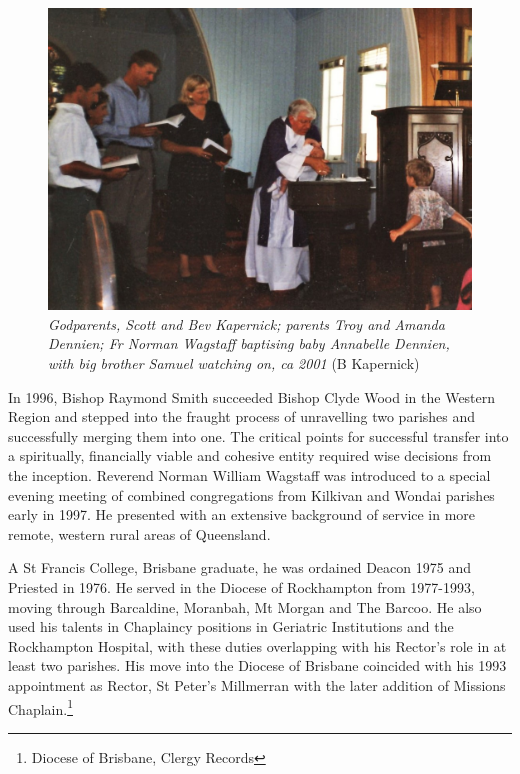 \begin{figure}[!htb]
\begin{center}
\includegraphics[width=1.\textwidth,center]{../images/baptism2001.jpg}
\caption{{\itshape Godparents, Scott and Bev Kapernick; parents Troy and Amanda Dennien; Fr Norman Wagstaff baptising baby Annabelle Dennien, with big brother Samuel watching on, ca 2001} {\scriptsize(B Kapernick)}}
\end{center}
\end{figure}




In 1996, Bishop Raymond Smith succeeded Bishop Clyde Wood in the Western Region and stepped into the fraught process of unravelling two parishes and successfully merging them into one. The critical points for successful transfer into a spiritually, financially viable and cohesive entity required wise decisions from the inception. Reverend Norman William Wagstaff was introduced to a special evening meeting of combined congregations from Kilkivan and Wondai parishes early in 1997. He presented with an extensive background of service in more remote, western rural areas of Queensland.



A St Francis College, Brisbane graduate, he was ordained Deacon 1975 and Priested in 1976. He served in the Diocese of Rockhampton from 1977-1993, moving through Barcaldine, Moranbah, Mt Morgan and The Barcoo. He also used his talents in Chaplaincy positions in Geriatric Institutions and the Rockhampton Hospital, with these duties overlapping with his Rector's role in at least two parishes. His move into the Diocese of Brisbane coincided with his 1993 appointment as Rector, St Peter's Millmerran with the later addition of Missions Chaplain.\footnote{Diocese of Brisbane, Clergy Records}


